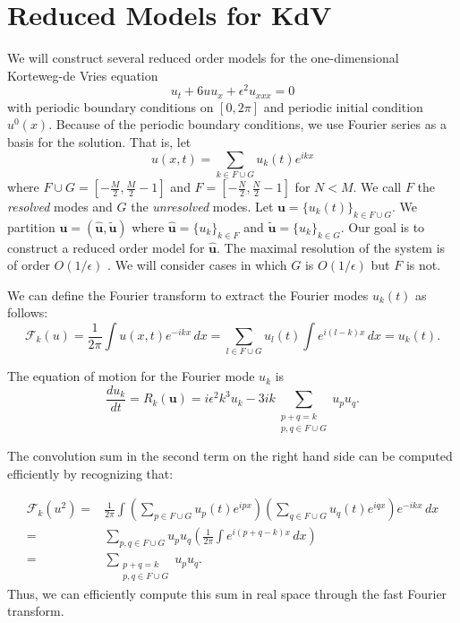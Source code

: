 \documentclass{article}
\begin{document}
\section{Reduced Models for KdV}

We will construct several reduced order models for the one-dimensional Korteweg-de Vries equation
\begin{equation}
u_t+6uu_x+\epsilon^2 u_{xxx}=0
\end{equation}
with periodic boundary conditions on $[0,2\pi]$ and periodic initial condition $u^0(x)$. Because of the periodic boundary conditions, we use Fourier series as a basis for the solution. That is, let \[u(x,t) = \sum_{k\in F\cup G} u_k(t) e^{ikx}\]where $F\cup G = \left[ -\frac{M}{2},\frac{M}{2}-1\right]$ and $F=\left[-\frac{N}{2},\frac{N}{2}-1\right]$ for $N<M$. We call $F$ the \emph{resolved} modes and $G$ the \emph{unresolved} modes. Let $\mathbf{u} =\{u_k(t)\}_{k\in F\cup G}$. We partition $\mathbf{u}=(\hat{\mathbf{u}},\tilde{\mathbf{u}})$ where $\hat{\mathbf{u}} = \{u_k\}_{k\in F}$ and $\tilde{\mathbf{u}}=\{u_k\}_{k\in G}$. Our goal is to construct a reduced order model for $\hat{\mathbf{u}}$. The maximal resolution of the system is of order $O(1/\epsilon)$ \cite{venakides1987zero}. We will consider cases in which $G$ is $O(1/\epsilon)$ but $F$ is not.

We can define the Fourier transform to extract the Fourier modes $u_k(t)$ as follows:
\[\mathcal{F}_k(u) = \frac{1}{2\pi}\int u(x,t)e^{-ikx}\,dx = \sum_{l\in F\cup G} u_l(t)\int e^{i(l-k)x}\,dx = u_k(t).
\]

The equation of motion for the Fourier mode $u_k$ is
\begin{equation}
\frac{d u_k}{dt} =R_k(\mathbf{u}) = i\epsilon^2 k^3 u_k-3ik\sum_{\substack{p+q=k\\p,q\in F\cup G}}u_p u_q.\label{full}
\end{equation}

The convolution sum in the second term on the right hand side can be computed efficiently by recognizing that:

\begin{align*}
\mathcal{F}_k(u^2) =& \frac{1}{2\pi}\int \left(\sum_{p\in F\cup G}u_p(t)e^{ipx}\right)\left(\sum_{q\in F\cup G}u_q(t)e^{iqx}\right)e^{-ikx}\,dx\\
=&\sum_{p,q\in F\cup G} u_pu_q\left(\frac{1}{2\pi}\int e^{i(p+q-k)x}\,dx\right)\\
=&\sum_{\substack{p+q=k\\p,q\in F\cup G}}u_pu_q.
\end{align*}Thus, we can efficiently compute this sum in real space through the fast Fourier transform.
\end{document}
